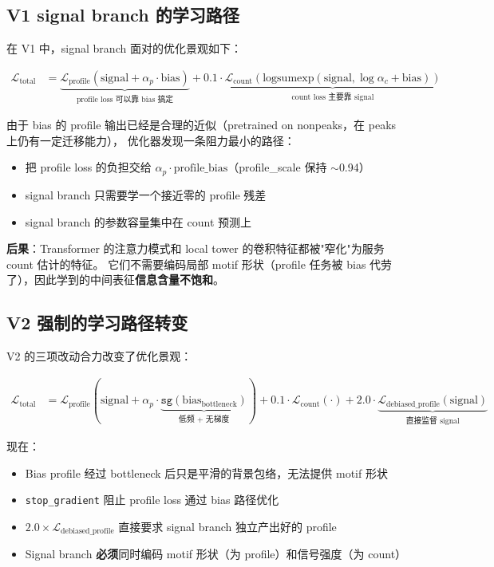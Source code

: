 \documentclass[11pt,a4paper]{ctexart}
\begin{document}
\subsection{V1 signal branch 的学习路径}

在 V1 中，signal branch 面对的优化景观如下：

\begin{align}
\mathcal{L}_{\text{total}} &= \underbrace{\mathcal{L}_{\text{profile}}(\text{signal} + \alpha_p \cdot \text{bias})}_{\text{profile loss 可以靠 bias 搞定}} + 0.1 \cdot \underbrace{\mathcal{L}_{\text{count}}(\text{logsumexp}(\text{signal}, \log\alpha_c + \text{bias}))}_{\text{count loss 主要靠 signal}} \label{eq:v1loss}
\end{align}

由于 bias 的 profile 输出已经是合理的近似（pretrained on nonpeaks，在 peaks 上仍有一定迁移能力），
优化器发现一条阻力最小的路径：
\begin{itemize}[leftmargin=2em]
  \item 把 profile loss 的负担交给 $\alpha_p \cdot \text{profile\_bias}$（profile\_scale 保持 $\sim$0.94）
  \item signal branch 只需要学一个接近零的 profile 残差
  \item signal branch 的参数容量集中在 count 预测上
\end{itemize}

\textbf{后果}：Transformer 的注意力模式和 local tower 的卷积特征都被"窄化"为服务 count 估计的特征。
它们不需要编码局部 motif 形状（profile 任务被 bias 代劳了），因此学到的中间表征\textbf{信息含量不饱和}。

\subsection{V2 强制的学习路径转变}

V2 的三项改动合力改变了优化景观：

\begin{align}
\mathcal{L}_{\text{total}} &= \mathcal{L}_{\text{profile}}(\text{signal} + \alpha_p \cdot \underbrace{\texttt{sg}(\text{bias}_{\text{bottleneck}})}_{\text{低频 + 无梯度}}) + 0.1 \cdot \mathcal{L}_{\text{count}}(\cdot) + 2.0 \cdot \underbrace{\mathcal{L}_{\text{debiased\_profile}}(\text{signal})}_{\text{直接监督 signal}} \label{eq:v2loss}
\end{align}

现在：
\begin{itemize}[leftmargin=2em]
  \item Bias profile 经过 bottleneck 后只是平滑的背景包络，无法提供 motif 形状
  \item \texttt{stop\_gradient} 阻止 profile loss 通过 bias 路径优化
  \item $2.0 \times \mathcal{L}_{\text{debiased\_profile}}$ 直接要求 signal branch 独立产出好的 profile
  \item Signal branch \textbf{必须}同时编码 motif 形状（为 profile）和信号强度（为 count）
\end{itemize}
\end{document}
